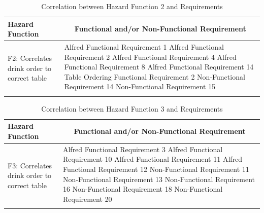 \documentclass [10pt]{article}
\begin{document}
\begin{longtable}{| p{ } | p{ } |}
\hline 
\centering \textbf{Hazard Function} & 
\multicolumn{1}{c}{\textbf {Functional and/or Non-Functional Requirement}}\\ \hline
\multirow{6}{*}{F2: Correlates drink order to correct table} & 
		{Alfred Functional Requirement 1 \newline
		Alfred Functional Requirement 2 \newline
		Alfred Functional Requirement 4 \newline
		Alfred Functional Requirement 8 \newline
		Alfred Functional Requirement 14 \newline
		Table Ordering Functional Requirement 2 \newline
		Non-Functional Requirement 14 \newline
		Non-Functional Requirement 15} \\
\hline 
\caption{Correlation between Hazard Function 2 and Requirements}  
\end{longtable}



\begin{longtable}{| p{ } | p{ } |}
\hline 
\centering \textbf{Hazard Function} & 
\multicolumn{1}{c}{\textbf {Functional and/or Non-Functional Requirement}}\\ \hline
\multirow{7}{*}{F3: Correlates drink order to correct table} & 
		{Alfred Functional Requirement 3 \newline
		Alfred Functional Requirement 10 \newline
		Alfred Functional Requirement 11 \newline
		Alfred Functional Requirement 12 \newline
		Non-Functional Requirement 11 \newline
		Non-Functional Requirement 13 \newline
		Non-Functional Requirement 16 \newline
		Non-Functional Requirement 18 \newline
		Non-Functional Requirement 20} \\ 
\hline 
\caption{Correlation between Hazard Function 3 and Requirements}  
\end{longtable}

\end{document}
